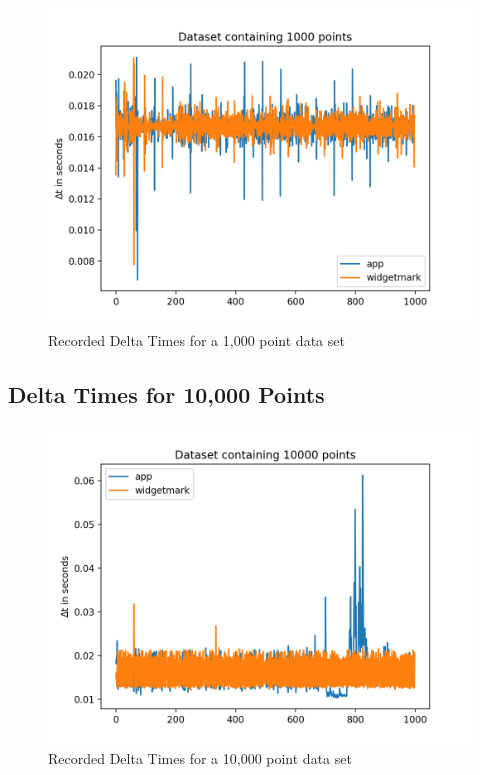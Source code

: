 \begin{figure}[h]
    \centering
    \includegraphics[width=14cm]{resources/img/evaluation/Eval_1000}
    \caption{
        Recorded Delta Times for a 1,000 point data set
    }
    \label{a:tab:evaluation:1000}
\end{figure}

\clearpage


\subsection{Delta Times for 10,000 Points}

\begin{figure}[h]
    \centering
    \includegraphics[width=14cm]{resources/img/evaluation/Eval_10000}
    \caption{
        Recorded Delta Times for a 10,000 point data set
    }
    \label{a:tab:evaluation:10000}
\end{figure}

